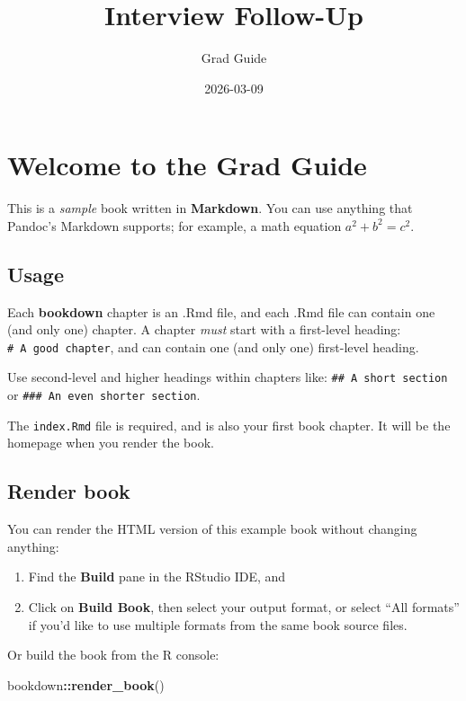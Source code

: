 \documentclass[
]{book}
\title{Interview Follow-Up}
\author{Grad Guide}
\date{2026-03-09}
\newenvironment{Shaded}{\begin{snugshade}}{\end{snugshade}}
\newcommand{\FunctionTok}[1]{\textcolor[rgb]{0.13,0.29,0.53}{\textbf{#1}}}
\newcommand{\NormalTok}[1]{#1}
\newcommand{\SpecialCharTok}[1]{\textcolor[rgb]{0.81,0.36,0.00}{\textbf{#1}}}
\theoremstyle{definition}
\theoremstyle{definition}
\theoremstyle{definition}
\theoremstyle{definition}
\theoremstyle{remark}
\begin{document}
\maketitle

{
\setcounter{tocdepth}{1}
\tableofcontents
}
\chapter{Welcome to the Grad Guide}\label{welcome-to-the-grad-guide}

This is a \emph{sample} book written in \textbf{Markdown}. You can use anything that Pandoc's Markdown supports; for example, a math equation \(a^2 + b^2 = c^2\).

\section{Usage}\label{usage}

Each \textbf{bookdown} chapter is an .Rmd file, and each .Rmd file can contain one (and only one) chapter. A chapter \emph{must} start with a first-level heading: \texttt{\#\ A\ good\ chapter}, and can contain one (and only one) first-level heading.

Use second-level and higher headings within chapters like: \texttt{\#\#\ A\ short\ section} or \texttt{\#\#\#\ An\ even\ shorter\ section}.

The \texttt{index.Rmd} file is required, and is also your first book chapter. It will be the homepage when you render the book.

\section{Render book}\label{render-book}

You can render the HTML version of this example book without changing anything:

\begin{enumerate}
\def\labelenumi{\arabic{enumi}.}
\item
  Find the \textbf{Build} pane in the RStudio IDE, and
\item
  Click on \textbf{Build Book}, then select your output format, or select ``All formats'' if you'd like to use multiple formats from the same book source files.
\end{enumerate}

Or build the book from the R console:

\begin{Shaded}
\begin{Highlighting}[]
\NormalTok{bookdown}\SpecialCharTok{::}\FunctionTok{render\_book}\NormalTok{()}
\end{Highlighting}
\end{Shaded}
\end{document}
